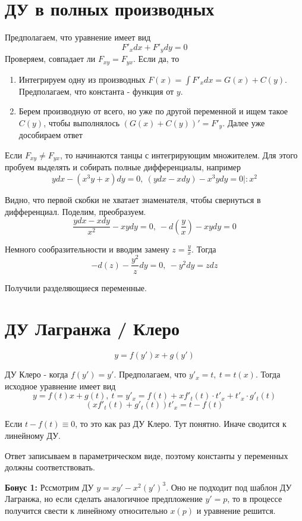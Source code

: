 \documentclass[11pt]{article}
\begin{document}
	\section{ДУ в полных производных}
	Предполагаем, что уравнение имеет вид
	$$F'_x dx + F'_y dy = 0$$
	Проверяем, совпадает ли $F_{xy} = F_{yx}$. Если да, то
	\begin{enumerate}
		\item Интегрируем одну из производных 
		$F(x) = \int F'_x dx = G(x) + C(y)$. Предполагаем, что константа - функция от $y$.
		\item Берем производную от всего, но уже по другой переменной и ищем такое $C(y)$, чтобы выполнялось $(G(x) + C(y))' = F'_y$. Далее уже дособираем ответ
	\end{enumerate}

	Если $F_{xy} \neq F_{yx}$, то начинаются танцы с интегрирующим множителем. Для этого пробуем выделять и собирать полные дифференциалы, например
	$$ydx - (x^3 y+x)dy = 0,\ (ydx - xdy) - x^3 ydy = 0 |: x^2$$
	
	Видно, что первой скобки не хватает знаменателя, чтобы свернуться в дифференциал. Поделим, преобразуем.
	$$\frac{ydx - xdy}{x^2} - xy dy = 0,\ -d(\frac{y}{x}) - xy dy = 0$$
	
	Немного сообразительности и вводим замену $z = \frac{y}{x}$. Тогда 
	$$-d(z) - \frac{y^2}{z} dy = 0,\ -y^2 dy = z dz$$
	
	Получили разделяющиеся переменные.
	

	\section{ДУ Лагранжа / Клеро}
	$$y = f(y') x + g(y')$$
	
	ДУ Клеро - когда $f(y') = y'$. Предполагаем, что $y'_x = t,\ t = t(x)$. Тогда исходное уравнение имеет вид
	$$y = f(t) x + g(t),\ t = y'_x = f(t) + xf'_t(t)\cdot t'_x + t'_x\cdot g'_t(t) $$
	$$(xf'_t(t) + g'_t(t))t'_x = t - f(t)$$
	
	Если $t - f(t) \equiv 0$, то это как раз ДУ Клеро. Тут понятно. Иначе сводится к линейному ДУ.
	
	Ответ записываем в параметрическом виде, поэтому константы у переменных должны соответствовать.
	
	\textbf{Бонус 1:} Рссмотрим ДУ $y = xy' - x^2 (y')^3$. Оно не подходит под шаблон ДУ Лагранжа, но если сделать аналогичное предпложение $y' = p$, то в процессе получится свести к линейному относительно $x(p)$ и уравнение решится.
	
\end{document}

